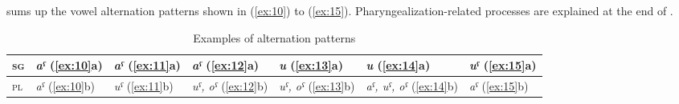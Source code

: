 \documentclass[output=paper]{langsci/langscibook}
\begin{document}
\ex \label{ex:11} %
\ea {}%
%
\exsameline %
\z

\ex \label{ex:12} %
\ea {}%
%
\exsameline %
\z

\ex \label{ex:13} %
\ea {}%
%
\exsameline %
\z

\ex \label{ex:14} %
\ea {}%
%
\exsameline %
\z

\ex \label{ex:15} %
\ea {}%
%
\exsameline %
\z
\z


 sums up the vowel alternation patterns shown in (\ref{ex:10}) to (\ref{ex:15}).
Pharyngealization\hskip0pt-related processes are explained at the end of .

\begin{table}
\caption{Examples of alternation patterns}\label{t3-2}

\begin{tabular}{@{}lllllll@{}}
\toprule
\textsc{sg} & \emph{aˤ} (\ref{ex:10}a) & \emph{aˤ} (\ref{ex:11}a) & \emph{aˤ} (\ref{ex:12}a) &
\emph{u} (\ref{ex:13}a) & \emph{u} (\ref{ex:14}a) & \emph{uˤ} (\ref{ex:15}a)\tabularnewline \midrule
\textsc{pl} & \emph{aˤ} (\ref{ex:10}b) & \emph{uˤ} (\ref{ex:11}b) & \emph{uˤ, oˤ} (\ref{ex:12}b) &
\emph{uˤ, oˤ} (\ref{ex:13}b) & \emph{aˤ, uˤ, oˤ} (\ref{ex:14}b) & \emph{aˤ}
(\ref{ex:15}b)\tabularnewline
\bottomrule
\end{tabular}
\end{table}
\end{document}
